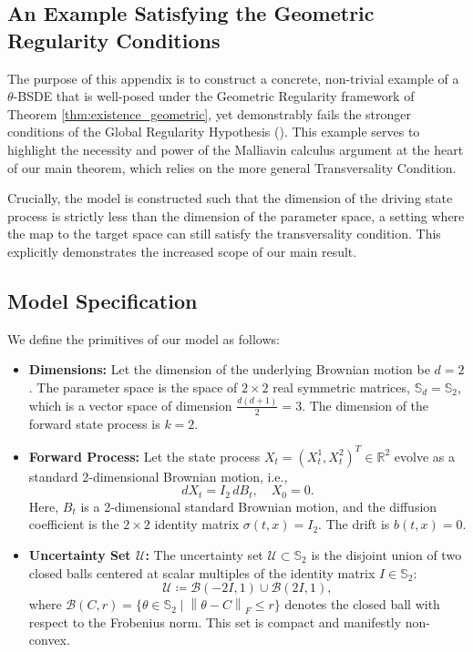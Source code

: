 \documentclass[12pt, letterpaper]{amsart}
\newcommand{\Ucal}{\mathcal{U}}
\newcommand{\Bcal}{\mathcal{B}}
\newcommand{\Sd}{\mathbb{S}_d}
\newcommand{\R}{\mathbb{R}}
\newcommand{\norm}[1]{\left\lVert#1\right\rVert}
\theoremstyle{plain}
\theoremstyle{definition}
\theoremstyle{remark}
\numberwithin{equation}{section} %
\begin{document}
\begin{appendices}
\section{An Example Satisfying the Geometric Regularity Conditions}
\label{app:geometric_example_corrected}

The purpose of this appendix is to construct a concrete, non-trivial example of a \(\theta\)-BSDE that is well-posed under the Geometric Regularity framework of Theorem \ref{thm:existence_geometric}, yet demonstrably fails the stronger conditions of the Global Regularity Hypothesis (). This example serves to highlight the necessity and power of the Malliavin calculus argument at the heart of our main theorem, which relies on the more general Transversality Condition.

Crucially, the model is constructed such that the dimension of the driving state process is strictly less than the dimension of the parameter space, a setting where the map to the target space can still satisfy the transversality condition. This explicitly demonstrates the increased scope of our main result.

\subsection{Model Specification}
We define the primitives of our model as follows:
\begin{itemize}
    \item \textbf{Dimensions:} Let the dimension of the underlying Brownian motion be $d=2$. The parameter space is the space of $2 \times 2$ real symmetric matrices, $\Sd = \mathbb{S}_2$, which is a vector space of dimension $\frac{d(d+1)}{2} = 3$. The dimension of the forward state process is $k=2$.
    
    \item \textbf{Forward Process:} Let the state process $X_t = (X_t^1, X_t^2)^T \in \R^2$ evolve as a standard 2-dimensional Brownian motion, i.e.,
    \[ dX_t = I_2 \, dB_t, \quad X_0 = 0. \]
    Here, $B_t$ is a 2-dimensional standard Brownian motion, and the diffusion coefficient is the $2 \times 2$ identity matrix $\sigma(t,x) = I_2$. The drift is $b(t,x) = 0$.
    
    \item \textbf{Uncertainty Set $\Ucal$:} The uncertainty set $\Ucal \subset \mathbb{S}_2$ is the disjoint union of two closed balls centered at scalar multiples of the identity matrix $I \in \mathbb{S}_2$:
    \[ \Ucal \coloneqq \Bcal(-2I, 1) \cup \Bcal(2I, 1), \]
    where $\Bcal(C, r) = \{\theta \in \mathbb{S}_2 \mid \norm{\theta - C}_F \le r\}$ denotes the closed ball with respect to the Frobenius norm. This set is compact and manifestly non-convex.


\end{itemize}
\end{appendices}
\end{document}
